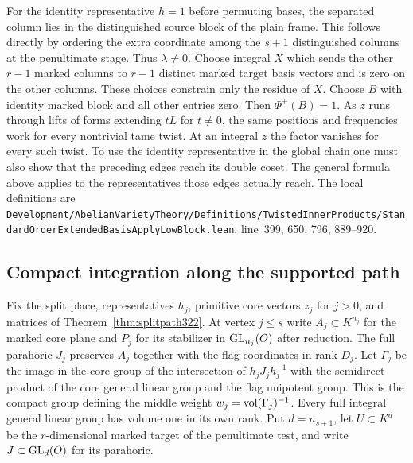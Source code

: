 \documentclass[a4paper,11pt]{article}
\theoremstyle{definition}
\theoremstyle{remark}
\newcommand{\srcloc}[2]{{\small\nolinkurl{#1.lean}}, line~#2}
\numberwithin{equation}{section}
\begin{document}
For the identity representative \(h=1\) before permuting
bases, the separated column lies in the distinguished source
block of the plain frame. This follows directly by ordering
the extra coordinate among the \(s+1\) distinguished columns
at the penultimate stage. Thus \(\lambda\ne0\).
Choose integral \(X\) which sends the other \(r-1\) marked
columns to \(r-1\) distinct marked target basis vectors and
is zero on the other columns. These choices constrain only
the residue of \(X\). Choose \(B\) with identity
marked block and all other entries zero. Then
\(\Phi^+(B)=1\). As \(z\) runs through lifts of forms extending
\(tL\) for \(t\ne0\), the same positions and frequencies work
for every nontrivial tame twist. At an integral \(z\) the
factor vanishes for every such twist. To use the identity
representative in the global chain one must also show that
the preceding edges reach its double coset. The general
formula above applies to the representatives those edges
actually reach. The local definitions are
\srcloc{Development/AbelianVarietyTheory/Definitions/TwistedInnerProducts/StandardOrderExtendedBasisApplyLowBlock}{399, 650, 796, 889--920}.

\subsection{Compact integration along the supported path}\label{nav:VII-68}
Fix the split place, representatives \(h_j\), primitive core
vectors \(z_j\) for \(j>0\), and matrices of
Theorem~\ref{thm:splitpath322}. At vertex \(j\le s\) write
\(A_j\subset K^{n_j}\) for the marked core plane and \(P_j\)
for its stabilizer in \({\rm GL}_{n_j}(O)\) after reduction.
The full parahoric \(J_j\) preserves \(A_j\) together with
the flag coordinates in rank \(D_j\). Let \(\Gamma_j\)
be the image in the core group of the intersection of
\(h_jJ_jh_j^{-1}\) with the semidirect product of the core
general linear group and the flag unipotent group. This is
the compact group defining the middle weight
\(w_j={\rm vol}(\Gamma_j)^{-1}\).
Every full integral general linear group has volume one
in its own rank. Put \(d=n_{s+1}\), let \(U\subset K^d\)
be the \(r\)-dimensional marked target of the penultimate
test, and write \(J\subset{\rm GL}_d(O)\) for its parahoric.
\end{document}
